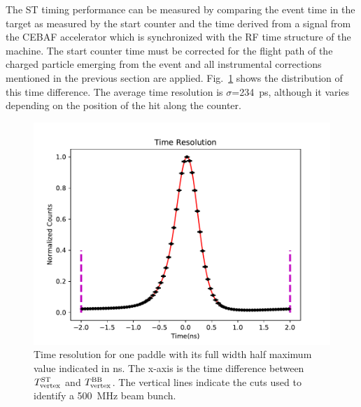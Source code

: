 The ST timing performance can be measured by comparing the event time in the target as measured by the start counter and the time derived from a signal from the CEBAF accelerator which is synchronized with the RF time structure of the machine. The start counter time must be corrected for the flight path of the charged particle emerging from the event and all instrumental corrections mentioned in the previous section are applied. Fig.~\ref{fig:st-time-resolution} shows the distribution of this time difference. The average time resolution is $\sigma$=234~ps, although it varies depending on the position of the hit along the counter. 

\begin{figure}[tbh]
  \centering
  \includegraphics[width=0.6\linewidth]{figures/st_tr_fit.pdf}
  \caption{Time resolution for one paddle with its full width half
    maximum value indicated in ns.  The x-axis is the time difference
    between $T^{\rm ST}_{\rm vertex}$ and $T^{\rm BB}_{\rm vertex}$.
    The vertical lines indicate the cuts used to identify a 500~MHz beam bunch.}
                \label{fig:st-time-resolution}
\end{figure}  


